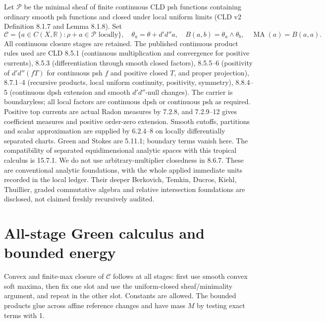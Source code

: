 \documentclass[11pt]{article}
\newcommand{\DD}{d'd''}
\newcommand{\MA}{\operatorname{MA}}
\newcommand{\C}{\mathcal C}
\newcommand{\RR}{\mathbb R}
\theoremstyle{remark}\newtheorem{remark}[theorem]{Remark}
\begin{document}
Let $\mathscr P$ be the minimal sheaf of finite continuous CLD psh
functions containing ordinary smooth psh functions and closed under
local uniform limits (CLD v2 Definition 8.1.7 and Lemma 8.1.8). Set
\[
\C=\{a\in C(X,\RR):\rho+a\in\mathscr P\text{ locally}\},\quad
\theta_a=\theta+\DD a,
\quad B(a,b)=\theta_a\wedge\theta_b,\quad \MA(a)=B(a,a).
\]
All continuous closure stages are retained. The published continuous
product rules used are CLD 8.5.1 (continuous multiplication and
convergence for positive currents), 8.5.3 (differentiation through smooth
closed factors), 8.5.5--6 (positivity of $\DD(fT)$ for continuous psh
$f$ and positive closed $T$, and proper projection), 8.7.1--4
(recursive products, local uniform continuity, positivity, symmetry),
8.8.4--5 (continuous dpsh extension and smooth $\DD$-null changes).
The carrier is boundaryless; all local factors are continuous dpsh or
continuous psh as required. Positive top currents are actual Radon
measures by 7.2.8, and 7.2.9--12 gives coefficient measures and positive
order-zero extension. Smooth cutoffs, partitions and scalar approximation
are supplied by 6.2.4--8 on locally differentially separated charts.
Green and Stokes are 5.11.1; boundary terms vanish here. The compatibility
of separated equidimensional analytic spaces with this tropical calculus
is 15.7.1. We do not use arbitrary-multiplier closedness in 8.6.7.
These are conventional analytic foundations, with the whole applied
immediate units recorded in the local ledger. Their deeper Berkovich,
Temkin, Ducros, Kiehl, Thuillier, graded commutative algebra and relative
intersection foundations are disclosed, not claimed freshly recursively
audited.

\section{All-stage Green calculus and bounded energy}
Convex and finite-max closure of $\C$ follows at all stages: first use
smooth convex soft maxima, then fix one slot and use the uniform-closed
sheaf/minimality argument, and repeat in the other slot. Constants are
allowed. The bounded products glue across affine reference changes and
have mass $M$ by testing exact terms with 1.
\end{document}

